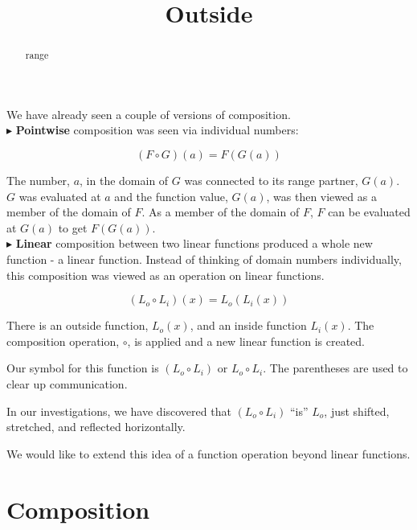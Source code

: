 \documentclass{ximera}
\title{Outside}
\begin{document}
\begin{abstract}
range
\end{abstract}
\maketitle





We have already seen a couple of versions of composition. \\

$\blacktriangleright$ \textbf{\textcolor{purple!85!blue}{Pointwise}} composition was seen via individual numbers: 

\[ (F \circ G)(a) = F(G(a)) \]

The number, $a$, in the domain of $G$ was connected to its range partner, $G(a)$.  $G$ was evaluated at $a$ and the function value, $G(a)$, was then viewed as a member of the domain of $F$.  As a member of the domain of $F$, $F$ can be evaluated at $G(a)$ to get $F(G(a))$. \\




$\blacktriangleright$ \textbf{\textcolor{purple!85!blue}{Linear}} composition between two linear functions produced a whole new function - a linear function.  Instead of thinking of domain numbers individually, this composition was viewed as an operation on linear functions.

\[    (L_o \circ L_i)(x) = L_o(L_i(x))  \]

There is an outside function, $L_o(x)$, and an inside function $L_i(x)$.  The composition operation, $\circ$, is applied and a new linear function is created.  



Our symbol for this function is $(L_o \circ L_i)$ or $L_o \circ L_i$.  The parentheses are used to clear up communication.

In our investigations, we have discovered that $(L_o \circ L_i)$ ``is'' $L_o$, just shifted, stretched, and reflected horizontally.


We would like to extend this idea of a function operation beyond linear functions.





\section*{Composition}
\end{document}
